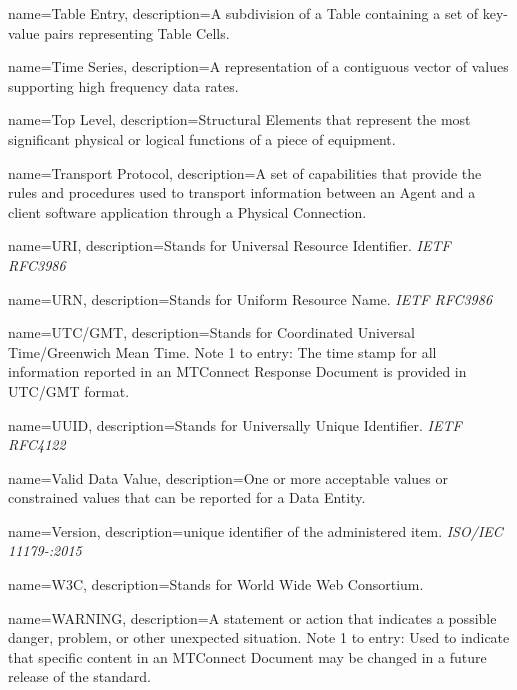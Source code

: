{
    name={Table Entry},
	description={A subdivision of a \gls{Table} containing a set of \glspl{key-value pair} representing \glspl{Table Cell}.}
}

{
    name={Time Series},
	description={A  representation of a contiguous vector of values supporting high frequency data rates.}
}

{
    name={Top Level},
	description={\glspl{Structural Element} that represent the most significant physical or logical functions of a piece of equipment.}
}

{
    name={Transport Protocol},
	description={A set of capabilities that provide the rules and procedures used to transport information between an \gls{Agent} and a client software application through a \gls{Physical Connection}.}
}

{
    name={URI},
	description={Stands for Universal Resource Identifier. \textit{IETF RFC3986}
}
}

{
    name={URN},
	description={Stands for Uniform Resource Name. \textit{IETF RFC3986}
}
}

{
    name={UTC/GMT},
	description={Stands for Coordinated Universal Time/Greenwich Mean Time.  
Note 1 to entry: The \gls{time stamp} for all information reported in an \gls{MTConnect Response Document} is provided in UTC/GMT format.}
}

{
    name={UUID},
	description={Stands for Universally Unique Identifier.  \textit{IETF RFC4122}}
}

{
    name={Valid Data Value},
	description={One or more acceptable values or constrained values that can be reported for a \gls{Data Entity}.}
}

{
    name={Version},
	description={unique identifier of the administered item. \textit{ISO/IEC 11179-:2015}}
}

{
    name={W3C},
	description={Stands for World Wide Web Consortium.}
}

{
    name={WARNING},
	description={A statement or action that indicates a possible danger, problem, or other unexpected situation.
Note 1 to entry: Used to indicate that specific content in an \gls{MTConnect Document} may be changed in a future release of the standard.}
}


